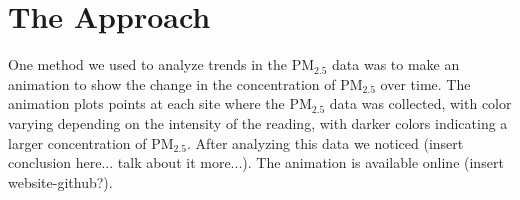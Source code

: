 \documentclass[10pt]{article}
\begin{document}
\section{The Approach}

One method we used to analyze trends in the PM$_{2.5}$ data was to make an animation to show the change in the concentration of PM$_{2.5}$  over time. The animation plots points at each site where the PM$_{2.5}$ data was collected, with color varying depending on the intensity of the reading, with darker colors indicating a larger concentration of PM$_{2.5}$. After analyzing this data we noticed (insert conclusion here... talk about it more...). The animation is available online (insert website-github?).
\end{document}
